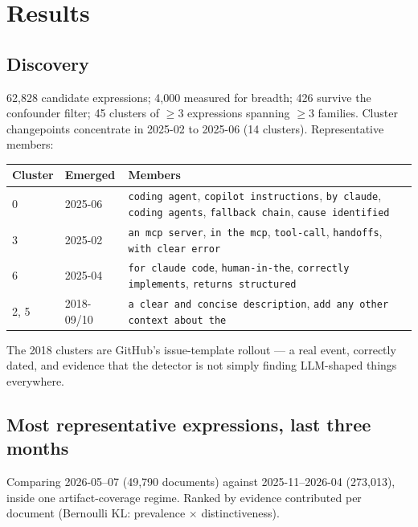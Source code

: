 \documentclass[11pt,a4paper]{article}
\newcommand{\expr}[1]{\texttt{\small #1}}
\begin{document}
\section{Results}

\subsection{Discovery}

62{,}828 candidate expressions; 4{,}000 measured for breadth; 426 survive the
confounder filter; 45 clusters of $\geq 3$ expressions spanning $\geq 3$ families.
Cluster changepoints concentrate in 2025-02 to 2025-06 (14 clusters). Representative
members:

\begin{center}\small
\begin{tabular}{@{}llp{8.4cm}@{}}
\toprule
\textbf{Cluster} & \textbf{Emerged} & \textbf{Members} \\
\midrule
0 & 2025-06 & \expr{coding agent}, \expr{copilot instructions}, \expr{by claude},
\expr{coding agents}, \expr{fallback chain}, \expr{cause identified} \\
3 & 2025-02 & \expr{an mcp server}, \expr{in the mcp}, \expr{tool-call},
\expr{handoffs}, \expr{with clear error} \\
6 & 2025-04 & \expr{for claude code}, \expr{human-in-the},
\expr{correctly implements}, \expr{returns structured} \\
2, 5 & 2018-09/10 & \expr{a clear and concise description},
\expr{add any other context about the} \\
\bottomrule
\end{tabular}
\end{center}

The 2018 clusters are GitHub's issue-template rollout --- a real event, correctly
dated, and evidence that the detector is not simply finding LLM-shaped things
everywhere.

\subsection{Most representative expressions, last three months}

Comparing 2026-05--07 (49{,}790 documents) against 2025-11--2026-04 (273{,}013),
inside one artifact-coverage regime. Ranked by evidence contributed per document
(Bernoulli KL: prevalence $\times$ distinctiveness).
\end{document}
